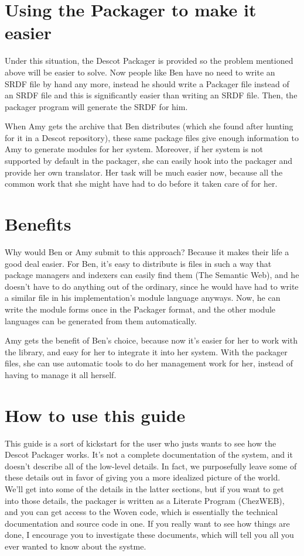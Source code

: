 \section{Using the Packager to make it easier}{}%
Under this situation, the Descot Packager is provided so the problem
mentioned above will be easier to solve. Now people like Ben have
no need to write an SRDF file by hand any more, instead he should write
a Packager file instead of an SRDF file and this is significantly easier
than writing an SRDF file. Then, the packager program will generate the
SRDF for him.

When Amy gets the archive that Ben distributes (which she found after
hunting for it in a Descot repository), these same package files give
enough information to Amy to generate modules for her system.
Moreover, if her system is not supported by default in the packager,
she can easily hook into the packager and provide her own translator.
Her task will be much easier now, because all the common work that
she might have had to do before it taken care of for her.

\section{Benefits}{}%
Why would Ben or Amy submit to this approach? Because it makes their
life a good deal easier. For Ben, it's easy to distribute is files in
such a way that package managers and indexers can easily find them
(The Semantic Web), and he doesn't have to do anything out of the
ordinary, since he would have had to write a similar file in his
implementation's module language anyways. Now, he can write the module
forms once in the Packager format, and the other module languages can
be generated from them automatically. 
 
Amy gets the benefit of Ben's choice, because now it's easier for her
to work with the library, and easy for her to integrate it into her
system. With the packager files, she can use automatic tools to do her
management work for her, instead of having to manage it all herself.

\section{How to use this guide}{}%
This guide is a sort of kickstart for the user who justs wants to see
how the Descot Packager works. It's not a complete documentation of
the system, and it doesn't describe all of the low-level details. In
fact, we purposefully leave some of these details out in favor of
giving you a more idealized picture of the world. We'll get into some
of the details in the latter sections, but if you want to get into
those details, the packager is written as a Literate Program
(ChezWEB), and you can get access to the Woven code, which is
essentially the technical documentation and source code in one. If you
really want to see how things are done, I encourage you to investigate
these documents, which will tell you all you ever wanted to know about
the systme.

